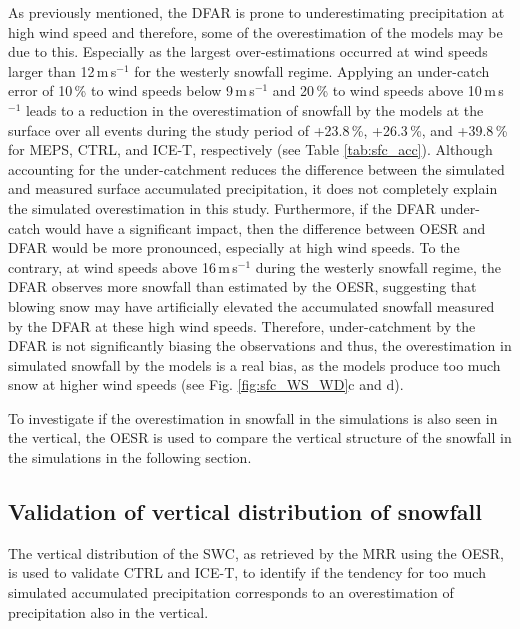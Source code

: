 \documentclass{ametsocV5}
\begin{document}
        As previously mentioned, the DFAR is prone to underestimating precipitation at high wind speed and therefore, some of the overestimation of the models may be due to this. Especially as the largest over-estimations occurred at wind speeds larger than 12\,m\,s$^{-1}$ for the westerly snowfall regime. Applying an under-catch error of 10\,\% to wind speeds below 9\,m\,s$^{-1}$ and 20\,\% to wind speeds above 10\,m\,s$^{-1}$ leads to a reduction in the overestimation of snowfall by the models at the surface over all events during the study period of +23.8\,\%, +26.3\,\%, and +39.8\,\% for MEPS, CTRL, and ICE-T, respectively (see Table \ref{tab:sfc_acc}). Although accounting for the under-catchment reduces the difference between the simulated and measured surface accumulated precipitation, it does not completely explain the simulated overestimation in this study. Furthermore, if the DFAR under-catch would have a significant impact, then the difference between OESR and DFAR would be more pronounced, especially at high wind speeds. To the contrary, at wind speeds above 16\,m\,s$^{-1}$ during the westerly snowfall regime, the DFAR observes more snowfall than estimated by the OESR, suggesting that blowing snow may have artificially elevated the accumulated snowfall measured by the DFAR at these high wind speeds. Therefore, under-catchment by the DFAR is not significantly biasing the observations and thus, the overestimation in simulated snowfall by the models is a real bias, as the models produce too much snow at higher wind speeds (see Fig. \ref{fig:sfc_WS_WD}c and d).
        

        To investigate if the overestimation in snowfall in the simulations is also seen in the vertical, the OESR is used to compare the vertical structure of the snowfall in the simulations in the following section.
%
    \subsection{Validation of vertical distribution of snowfall}\label{sec:res:swc}
        The vertical distribution of the SWC, as retrieved by the MRR using the OESR, is used to validate CTRL and ICE-T, to identify if the tendency for too much simulated accumulated precipitation corresponds to an overestimation of precipitation also in the vertical.
        
\end{document}
